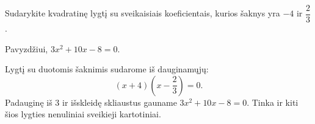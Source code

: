 \begin{salyga}
Sudarykite kvadratinę lygtį su sveikaisiais koeficientais, kurios šaknys yra $-4$ ir $\dfrac{2}{3}$.
\end{salyga}

\begin{atsakymas}
Pavyzdžiui, $3x^2+10x-8=0$.
\end{atsakymas}

\begin{sprendimas}
Lygtį su duotomis šaknimis sudarome iš dauginamųjų:
\[
(x+4)\left(x-\frac23\right)=0.
\]
Padauginę iš $3$ ir išskleidę skliaustus gauname $3x^2+10x-8=0$. Tinka ir kiti šios lygties nenuliniai sveikieji kartotiniai.
\end{sprendimas}
